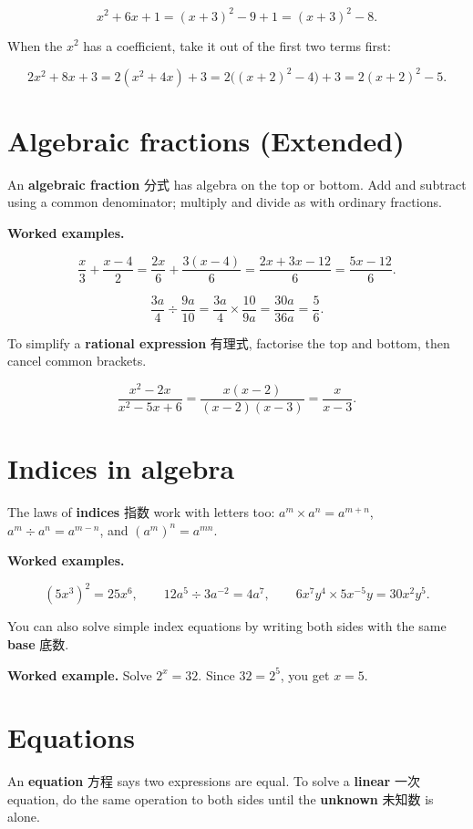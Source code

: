 \documentclass[11pt]{article}
\begin{document}
\[
x^{2} + 6x + 1 = (x + 3)^{2} - 9 + 1 = (x + 3)^{2} - 8.
\]

When the $x^{2}$ has a coefficient, take it out of the first two terms first:

\[
2x^{2} + 8x + 3 = 2(x^{2} + 4x) + 3 = 2\big((x + 2)^{2} - 4\big) + 3 = 2(x + 2)^{2} - 5.
\]

\section*{Algebraic fractions (Extended)}

An \textbf{algebraic fraction} 分式 has algebra on the top or bottom. Add and subtract using a common denominator; multiply and divide as with ordinary fractions.

\textbf{Worked examples.}

\[
\frac{x}{3} + \frac{x - 4}{2} = \frac{2x}{6} + \frac{3(x - 4)}{6} = \frac{2x + 3x - 12}{6} = \frac{5x - 12}{6}.
\]

\[
\frac{3a}{4} \div \frac{9a}{10} = \frac{3a}{4} \times \frac{10}{9a} = \frac{30a}{36a} = \frac{5}{6}.
\]

To simplify a \textbf{rational expression} 有理式, factorise the top and bottom, then cancel common brackets.

\[
\frac{x^{2} - 2x}{x^{2} - 5x + 6} = \frac{x(x - 2)}{(x - 2)(x - 3)} = \frac{x}{x - 3}.
\]

\section*{Indices in algebra}

The laws of \textbf{indices} 指数 work with letters too: $a^{m} \times a^{n} = a^{m+n}$, $a^{m} \div a^{n} = a^{m-n}$, and $(a^{m})^{n} = a^{mn}$.

\textbf{Worked examples.}

\[
(5x^{3})^{2} = 25x^{6}, \qquad 12a^{5} \div 3a^{-2} = 4a^{7}, \qquad 6x^{7}y^{4} \times 5x^{-5}y = 30x^{2}y^{5}.
\]

You can also solve simple index equations by writing both sides with the same \textbf{base} 底数.

\textbf{Worked example.} Solve $2^{x} = 32$. Since $32 = 2^{5}$, you get $x = 5$.

\section*{Equations}

An \textbf{equation} 方程 says two expressions are equal. To solve a \textbf{linear} 一次 equation, do the same operation to both sides until the \textbf{unknown} 未知数 is alone.
\end{document}
